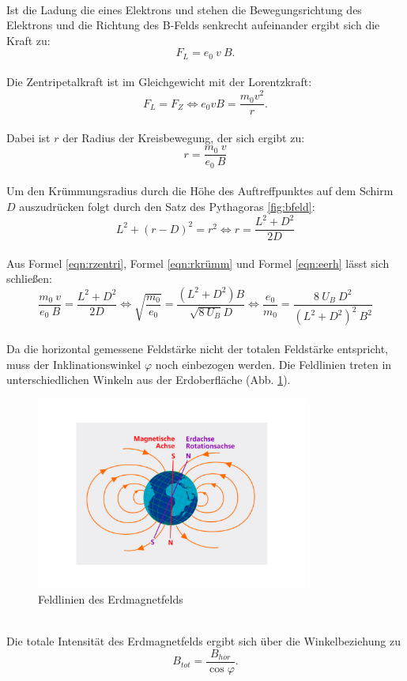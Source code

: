 \\Ist die Ladung die eines Elektrons und stehen die Bewegungsrichtung des Elektrons und die Richtung des B-Felds senkrecht aufeinander ergibt sich die Kraft zu:
\begin{equation*}
  F_{L}=e_{0} \: v \: B.
\end{equation*}
\\Die Zentripetalkraft ist im Gleichgewicht mit der Lorentzkraft:
\begin{equation*}
  F_{L}=F_{Z} \Leftrightarrow e_{0} v B = \frac{m_{0} v^2}{r}.
\end{equation*}
\\Dabei ist $r$ der Radius der Kreisbewegung, der sich ergibt zu:
\begin{equation}
  r=\frac{m_{0} \: v}{e_{0} \: B}
\label{eqn:rzentri}
\end{equation}
\\Um den Krümmungsradius durch die Höhe des Auftreffpunktes auf dem Schirm $D$ auszudrücken folgt durch den Satz des Pythagoras \ref{fig:bfeld}:
\begin{equation}
  L^2+(r-D)^2=r^2 \Leftrightarrow r= \frac{L^2+D^2}{2D}
\label{eqn:rkrümm}
\end{equation}
\\Aus Formel \eqref{eqn:rzentri}, Formel \eqref{eqn:rkrümm} und Formel \eqref{eqn:eerh} lässt sich schließen:
\begin{equation}
  \frac{m_{0} \: v}{e_{0} \: B} = \frac{L^2+D^2}{2D}
  \Leftrightarrow \sqrt{ \frac{m_{0}} {e_{0}}}=\frac{(L^2+D^2)B} {\sqrt{8 \: U_{B}} D}
  \Leftrightarrow \frac{e_{0}} {m_{0}}=\frac{8 \: U_{B} \: D^2} {(L^2+D^2)^2 \: B^2}
  \label{eqn:e0m0}
\end{equation}
\\Da die horizontal gemessene Feldstärke nicht der totalen Feldstärke entspricht, muss der Inklinationswinkel $\varphi$ noch einbezogen werden.
Die Feldlinien treten in unterschiedlichen Winkeln aus der Erdoberfläche (Abb. \ref{fig:erde}).
\begin{figure}[h!]
  \centering
  \includegraphics[width=0.8\textwidth]{erde.pdf}
  \caption{Feldlinien des Erdmagnetfelds \cite{3}}
  \label{fig:erde}
\end{figure}
\\Die totale Intensität des Erdmagnetfelds ergibt sich über die Winkelbeziehung zu
\begin{equation}
  B_{tot}=\frac{B_{hor}}{\cos{\varphi}}.
  \label{eqn:btot}
\end{equation}
\FloatBarrier

